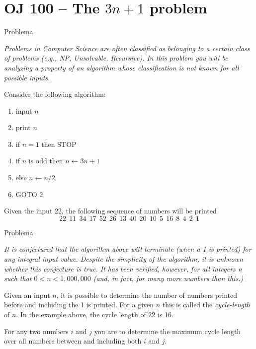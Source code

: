 \section{OJ 100 -- The $3n + 1$ problem}

\begin{frame}[fragile]{Problema}

{\it
Problems in Computer Science are often classified as belonging to a certain class of problems (e.g.,
NP, Unsolvable, Recursive). In this problem you will be analyzing a property of an algorithm whose
classification is not known for all possible inputs.

Consider the following algorithm:

\begin{enumerate}
\item input $n$
\item print $n$
\item if $n = 1$ then STOP
\item if $n$ is odd then $n \leftarrow 3n + 1$
\item else $n \leftarrow n/2$
\item GOTO 2
\end{enumerate}

Given the input 22, the following sequence of numbers will be printed
\[
22\ \ 11\ \ 34\ \ 17\ \ 52\ \ 26\ \ 13\ \ 40\ \ 20\ \ 10\ \ 5\ \ 16\ \ 8\ \ 4\ \ 2\ \ 1
\]
}

\end{frame}

\begin{frame}[fragile]{Problema}

{
\it
It is conjectured that the algorithm above will terminate (when a 1 is printed) for any integral input
value. Despite the simplicity of the algorithm, it is unknown whether this conjecture is true. It has
been verified, however, for all integers n such that $0 < n < 1,000,000$ (and, in fact, for many more
numbers than this.)

Given an input $n$, it is possible to determine the number of numbers printed before and including
the 1 is printed. For a given $n$ this is called the \textit{cycle-length} of $n$. In the example above, the cycle
length of 22 is 16.

For any two numbers $i$ and $j$ you are to determine the maximum cycle length over all numbers
between and including both $i$ and $j$.
}

\end{frame}

